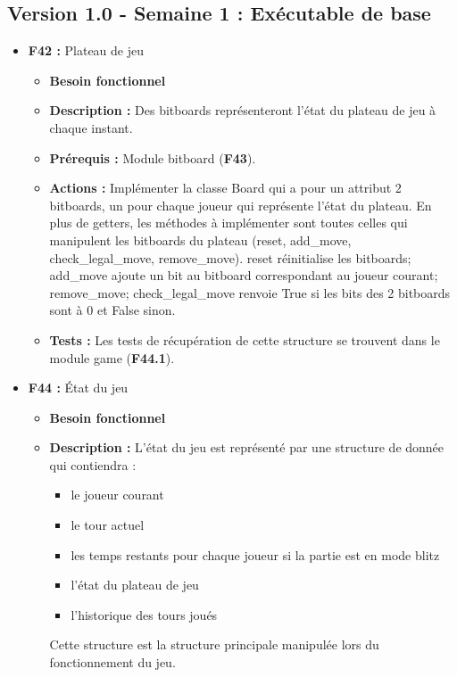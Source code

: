 \documentclass{article}
\begin{document}
\subsection{Version 1.0 - Semaine 1 : Exécutable de base}

\medskip
\begin{itemize}
    \item \textbf{F42 :} Plateau de jeu
    \begin{itemize}
        \item \textbf{Besoin fonctionnel}
        \item \textbf{Description :} Des bitboards représenteront l’état du plateau de jeu à chaque instant.
        \item \textbf{Prérequis :} Module bitboard (\textbf{F43}).
        \item \textbf{Actions :} Implémenter la classe Board qui a pour un attribut 2 bitboards, un pour chaque joueur qui représente l’état du plateau. En plus de getters, les méthodes à implémenter sont toutes celles qui manipulent les bitboards du plateau (reset, add\_move, check\_legal\_move, remove\_move). reset réinitialise les bitboards; add\_move ajoute un bit au bitboard correspondant au joueur courant; remove\_move; check\_legal\_move renvoie True si les bits des 2 bitboards sont à 0 et False sinon.
        \item \textbf{Tests :} Les tests de récupération de cette structure se trouvent dans le module game (\textbf{F44.1}).
    \end{itemize}
\bigskip
    \item \textbf{F44 :} État du jeu
    \begin{itemize}
        \item \textbf{Besoin fonctionnel}
        \item \textbf{Description :} L’état du jeu est représenté par une structure de donnée qui contiendra :
        \begin{itemize}
            \item le joueur courant
            \item le tour actuel
            \item les temps restants pour chaque joueur si la partie est en mode blitz
            \item l’état du plateau de jeu
            \item l'historique des tours joués
        \end{itemize}
        Cette structure est la structure principale manipulée lors du fonctionnement du jeu.

\end{itemize}
\end{itemize}
\end{document}

